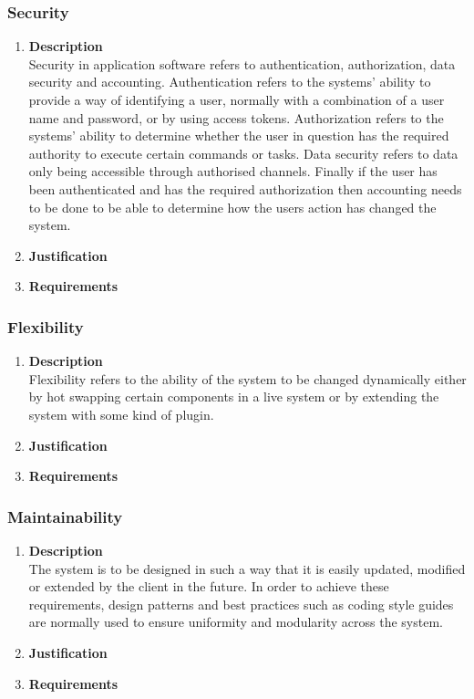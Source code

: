 \documentclass[a4paper,10pt]{article}
\begin{document}
	\subsubsection{Security}
		\begin{enumerate}
			\item \textbf{Description} \\
				Security in application software refers to authentication, authorization, data security and accounting. Authentication refers to the systems' ability to provide a way of identifying a user, normally with a combination of a user name and password, or by using access tokens. Authorization refers to the systems' ability to determine whether the user in question has the required authority to execute certain commands or tasks. Data security refers to data only being accessible through authorised channels. Finally if the user has been authenticated and has the required authorization then accounting needs to be done to be able to determine how the users action has changed the system.  

			\item \textbf{Justification} \\
			\item \textbf{Requirements}\\
		\end{enumerate}

	\subsubsection{Flexibility}
		\begin{enumerate}
			\item \textbf{Description} \\
				Flexibility refers to the ability of the system to be changed dynamically either by hot swapping certain components in a live system or by extending the system with some kind of plugin. 

			\item \textbf{Justification} \\
			\item \textbf{Requirements}\\
		\end{enumerate}

	\subsubsection{Maintainability}
		\begin{enumerate}
			\item \textbf{Description} \\
				The system is to be designed in such a way that it is easily updated, modified or extended by the client in the future. In order to achieve these requirements, design patterns and best practices such as coding style guides are normally used to ensure uniformity and modularity across the system.

			\item \textbf{Justification} \\
			\item \textbf{Requirements}\\
		\end{enumerate}
\end{document}
